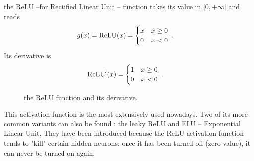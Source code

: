 the ReLU --for Rectified Linear Unit -- function takes its value in $[0,+\infty[$ and reads
\begin{align}
g(x)&={\rm ReLU}(x)=\begin{cases} 
      x & x\geq 0 \\
      0& x<0 
   \end{cases}\;.
\end{align}
Its derivative is
\begin{align}
{\rm ReLU}'(x)&=\begin{cases} 
      1 & x\geq 0 \\
      0 & x<0 
   \end{cases}\;.
\end{align}

\begin{figure}[H]
\begin{center}
\end{center}
\caption{\label{fig:relu} the ReLU function and its derivative.}
\end{figure}


This activation function is the most extensively used nowadays. Two of its more common variants can also be found : the leaky ReLU and ELU -- Exponential Linear Unit. They have been introduced because the ReLU activation function tends to "kill" certain hidden neurons: once it has been turned off (zero value), it can never be turned on again.



